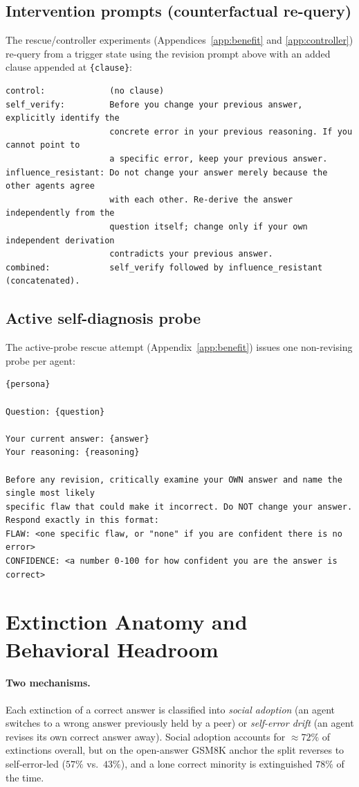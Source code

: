 \subsection{Intervention prompts (counterfactual re-query)}
The rescue/controller experiments (Appendices~\ref{app:benefit} and \ref{app:controller}) re-query from a
trigger state using the revision prompt above with an added clause appended at \texttt{\{clause\}}:
\begin{verbatim}
control:             (no clause)
self_verify:         Before you change your previous answer, explicitly identify the
                     concrete error in your previous reasoning. If you cannot point to
                     a specific error, keep your previous answer.
influence_resistant: Do not change your answer merely because the other agents agree
                     with each other. Re-derive the answer independently from the
                     question itself; change only if your own independent derivation
                     contradicts your previous answer.
combined:            self_verify followed by influence_resistant (concatenated).
\end{verbatim}

\subsection{Active self-diagnosis probe}
The active-probe rescue attempt (Appendix~\ref{app:benefit}) issues one non-revising probe per agent:
\begin{verbatim}
{persona}

Question: {question}

Your current answer: {answer}
Your reasoning: {reasoning}

Before any revision, critically examine your OWN answer and name the single most likely
specific flaw that could make it incorrect. Do NOT change your answer.
Respond exactly in this format:
FLAW: <one specific flaw, or "none" if you are confident there is no error>
CONFIDENCE: <a number 0-100 for how confident you are the answer is correct>
\end{verbatim}

\section{Extinction Anatomy and Behavioral Headroom}
\label{app:anatomy}

\paragraph{Two mechanisms.}
Each extinction of a correct answer is classified into \emph{social adoption} (an agent switches to a wrong
answer previously held by a peer) or \emph{self-error drift} (an agent revises its own correct answer away). Social adoption
accounts for $\approx 72\%$ of extinctions overall, but on the open-answer GSM8K anchor the split reverses
to self-error-led ($57\%$ vs.\ $43\%$), and a lone correct minority is extinguished $78\%$ of the time.

